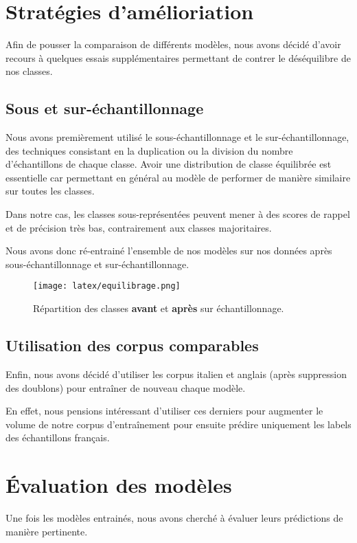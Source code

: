 \documentclass[11pt]{article}
\begin{document}
\section{Stratégies d'amélioriation}

Afin de pousser la comparaison de différents modèles, nous avons décidé d'avoir recours à quelques essais supplémentaires permettant de contrer le déséquilibre de nos classes. 

\subsection{Sous et sur-échantillonnage}
Nous avons premièrement utilisé le sous-échantillonnage et le sur-échantillonnage, des techniques consistant en la duplication ou la division du nombre d'échantillons de chaque classe. Avoir une distribution de classe équilibrée est essentielle car permettant en général au modèle de performer de manière similaire sur toutes les classes.

Dans notre cas, les classes sous-représentées peuvent mener à des scores de rappel et de précision très bas, contrairement aux classes majoritaires. 

Nous avons donc ré-entrainé l'ensemble de nos modèles sur nos données après sous-échantillonnage et sur-échantillonnage. 
\begin{figure}[H]
  \texttt{[image: latex/equilibrage.png]}
  \caption{Répartition des classes \textbf{avant} et \textbf{après} sur échantillonnage.}
  \label{fig:equilibrage} %
\end{figure}

\subsection{Utilisation des corpus comparables}
Enfin, nous avons décidé d'utiliser les corpus italien et anglais (après suppression des doublons) pour entraîner de nouveau chaque modèle.

En effet, nous pensions intéressant d'utiliser ces derniers pour augmenter le volume de notre corpus d'entraînement pour ensuite prédire uniquement les labels des échantillons français. 

\section{Évaluation des modèles}

Une fois les modèles entrainés, nous avons cherché à évaluer leurs prédictions de manière pertinente.
\end{document}
